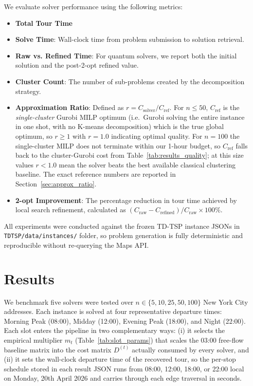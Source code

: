 \documentclass[conference]{IEEEtran}
\begin{document}
We evaluate solver performance using the following metrics:
\begin{itemize}
\item \textbf{Total Tour Time}
\item \textbf{Solve Time}: Wall-clock time from problem submission to solution retrieval.
\item \textbf{Raw vs. Refined Time}: For quantum solvers, we report both the initial solution and the post-2-opt refined value.
\item \textbf{Cluster Count}: The number of sub-problems created by the decomposition strategy.
\item \textbf{Approximation Ratio}: Defined as $r = C_{\text{solver}} / C_{\text{ref}}$. For $n \le 50$, $C_{\text{ref}}$ is the \emph{single-cluster} Gurobi MILP optimum (i.e.\ Gurobi solving the entire instance in one shot, with no K-means decomposition) which is the true global optimum, so $r \ge 1$ with $r = 1.0$ indicating optimal quality. For $n = 100$ the single-cluster MILP does not terminate within our 1-hour budget, so $C_{\text{ref}}$ falls back to the cluster-Gurobi cost from Table~\ref{tab:results_quality}; at this size values $r < 1.0$ mean the solver beats the best available classical clustering baseline. The exact reference numbers are reported in Section~\ref{sec:approx_ratio}.
\item \textbf{2-opt Improvement}: The percentage reduction in tour time achieved by local search refinement, calculated as $(C_{\text{raw}} - C_{\text{refined}}) / C_{\text{raw}} \times 100\%$.
\end{itemize}

All experiments were conducted against the frozen TD-TSP instance JSONs in \texttt{TDTSP/data/instances/} folder, so problem generation is fully deterministic and reproducible without re-querying the Maps API. 

\section{Results}

We benchmark five solvers were tested over $n \in \{5, 10, 25, 50, 100\}$ New York City addresses. Each instance is solved at four representative departure times: Morning Peak (08:00), Midday (12:00), Evening Peak (18:00), and Night (22:00). Each slot enters the pipeline in two complementary ways: (i) it selects the empirical multiplier $m_t$ (Table~\ref{tab:slot_params}) that scales the 03:00 free-flow baseline matrix into the cost matrix $D^{(t)}$ actually consumed by every solver, and (ii) it sets the wall-clock departure time of the recovered tour, so the per-stop schedule stored in each result JSON runs from 08:00, 12:00, 18:00, or 22:00 local on Monday, 20th April 2026 and carries through each edge traversal in seconds.
\end{document}
